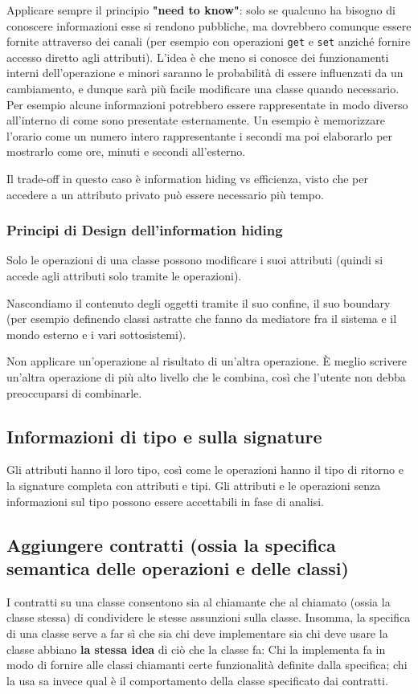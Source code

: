             Applicare sempre il principio \textbf{"need to know"}: solo se qualcuno ha bisogno di conoscere informazioni esse si rendono pubbliche, ma dovrebbero comunque essere fornite attraverso dei canali (per esempio con operazioni \texttt{get} e \texttt{set} anziché fornire accesso diretto agli attributi). L'idea è che meno si conosce dei funzionamenti interni dell'operazione e minori saranno le probabilità di essere influenzati da un cambiamento, e dunque sarà più facile modificare una classe quando necessario. Per esempio alcune informazioni potrebbero essere rappresentate in modo diverso all'interno di come sono presentate esternamente. Un esempio è memorizzare l'orario come un numero intero rappresentante i secondi ma poi elaborarlo per mostrarlo come ore, minuti e secondi all'esterno.
            
            Il trade-off in questo caso è information hiding vs efficienza, visto che per accedere a un attributo privato può essere necessario più tempo.
            
            \subsubsection{Principi di Design dell'information hiding} Solo le operazioni di una classe possono modificare i suoi attributi (quindi si accede agli attributi solo tramite le operazioni).
            
            Nascondiamo il contenuto degli oggetti tramite il suo confine, il suo boundary (per esempio definendo classi astratte che fanno da mediatore fra il sistema e il mondo esterno e i vari sottosistemi).
            
            Non applicare un'operazione al risultato di un'altra operazione. È meglio scrivere un'altra operazione di più alto livello che le combina, così che l'utente non debba preoccuparsi di combinarle.
            
        \subsection{Informazioni di tipo e sulla signature} Gli attributi hanno il loro tipo, così come le operazioni hanno il tipo di ritorno e la signature completa con attributi e tipi. Gli attributi e le operazioni senza informazioni sul tipo possono essere accettabili in fase di analisi.
            
        \subsection{Aggiungere contratti (ossia la specifica semantica delle operazioni e delle classi)} I contratti su una classe consentono sia al chiamante che al chiamato (ossia la classe stessa) di condividere le stesse assunzioni sulla classe. Insomma, la specifica di una classe serve a far sì che sia chi deve implementare sia chi deve usare la classe abbiano \textbf{la stessa idea} di ciò che la classe fa: Chi la implementa fa in modo di fornire alle classi chiamanti certe funzionalità definite dalla specifica; chi la usa sa invece qual è il comportamento della classe specificato dai contratti.
            

